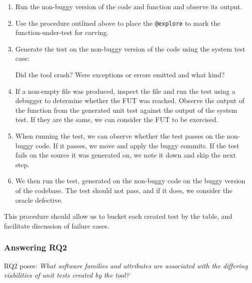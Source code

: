 \begin{enumerate}
      \item Run the non-buggy version of the code and function and observe its output.

      \item Use the procedure outlined above to place the \verb|@explore| to mark the function-under-test for carving.

      \item Generate the test on the non-buggy version of the code using the system test case:

            Did the tool crash? Were exceptions or errors emitted and what kind?

      \item If a non-empty file was produced, inspect the file and run the test using a debugger to determine
            whether the FUT was reached. Observe the
            output of the function from the generated unit test against the output of the system test. If they
            are the same, we can consider the FUT to
            be exercised.

      \item When running the test, we can observe whether the test passes on the non-buggy code. If it passes, we
            move and apply the buggy commits. If
            the test fails on the source it was generated on, we note it down and skip the next step.

      \item We then run the test, generated on the non-buggy code on the buggy version of the codebase. The test
            should not pass, and if it does, we
            consider the oracle defective.
\end{enumerate}

This procedure should allow us to bucket each created test by the table, and facilitate discussion of failure cases.

\subsubsection{Answering RQ2}

RQ2 poses: \textit{What software families and attributes are associated with the differing viabilities of unit
      tests created by the tool?}

